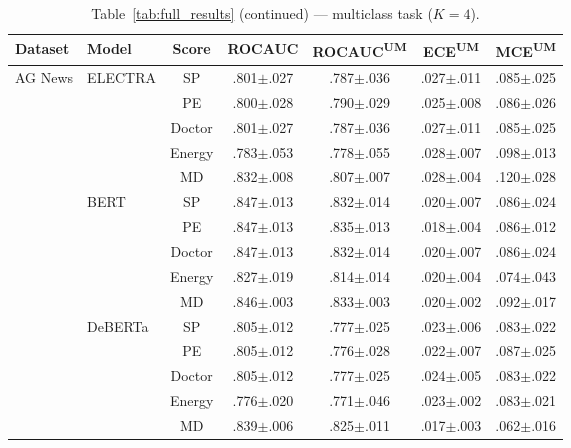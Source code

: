 \begin{table}[h]
\centering
\caption*{Table~\ref{tab:full_results} (continued) --- multiclass task ($K{=}4$).}
\footnotesize
\setlength{\tabcolsep}{4pt}
\begin{tabular}{@{}llccccc@{}}
\toprule
\textbf{Dataset} & \textbf{Model} & \textbf{Score} & \textbf{ROCAUC} & \textbf{ROCAUC\textsuperscript{UM}} & \textbf{ECE\textsuperscript{UM}} & \textbf{MCE\textsuperscript{UM}} \\
\midrule
AG News & ELECTRA & SP & .801{\scriptsize$\pm$.027} & .787{\scriptsize$\pm$.036} & .027{\scriptsize$\pm$.011} & .085{\scriptsize$\pm$.025} \\
 &  & PE & .800{\scriptsize$\pm$.028} & .790{\scriptsize$\pm$.029} & .025{\scriptsize$\pm$.008} & .086{\scriptsize$\pm$.026} \\
 &  & Doctor & .801{\scriptsize$\pm$.027} & .787{\scriptsize$\pm$.036} & .027{\scriptsize$\pm$.011} & .085{\scriptsize$\pm$.025} \\
 &  & Energy & .783{\scriptsize$\pm$.053} & .778{\scriptsize$\pm$.055} & .028{\scriptsize$\pm$.007} & .098{\scriptsize$\pm$.013} \\
 &  & MD & .832{\scriptsize$\pm$.008} & .807{\scriptsize$\pm$.007} & .028{\scriptsize$\pm$.004} & .120{\scriptsize$\pm$.028} \\
\cmidrule(l){2-7}
 & BERT & SP & .847{\scriptsize$\pm$.013} & .832{\scriptsize$\pm$.014} & .020{\scriptsize$\pm$.007} & .086{\scriptsize$\pm$.024} \\
 &  & PE & .847{\scriptsize$\pm$.013} & .835{\scriptsize$\pm$.013} & .018{\scriptsize$\pm$.004} & .086{\scriptsize$\pm$.012} \\
 &  & Doctor & .847{\scriptsize$\pm$.013} & .832{\scriptsize$\pm$.014} & .020{\scriptsize$\pm$.007} & .086{\scriptsize$\pm$.024} \\
 &  & Energy & .827{\scriptsize$\pm$.019} & .814{\scriptsize$\pm$.014} & .020{\scriptsize$\pm$.004} & .074{\scriptsize$\pm$.043} \\
 &  & MD & .846{\scriptsize$\pm$.003} & .833{\scriptsize$\pm$.003} & .020{\scriptsize$\pm$.002} & .092{\scriptsize$\pm$.017} \\
\cmidrule(l){2-7}
 & DeBERTa & SP & .805{\scriptsize$\pm$.012} & .777{\scriptsize$\pm$.025} & .023{\scriptsize$\pm$.006} & .083{\scriptsize$\pm$.022} \\
 &  & PE & .805{\scriptsize$\pm$.012} & .776{\scriptsize$\pm$.028} & .022{\scriptsize$\pm$.007} & .087{\scriptsize$\pm$.025} \\
 &  & Doctor & .805{\scriptsize$\pm$.012} & .777{\scriptsize$\pm$.025} & .024{\scriptsize$\pm$.005} & .083{\scriptsize$\pm$.022} \\
 &  & Energy & .776{\scriptsize$\pm$.020} & .771{\scriptsize$\pm$.046} & .023{\scriptsize$\pm$.002} & .083{\scriptsize$\pm$.021} \\
 &  & MD & .839{\scriptsize$\pm$.006} & .825{\scriptsize$\pm$.011} & .017{\scriptsize$\pm$.003} & .062{\scriptsize$\pm$.016} \\
\bottomrule
\end{tabular}
\end{table}
